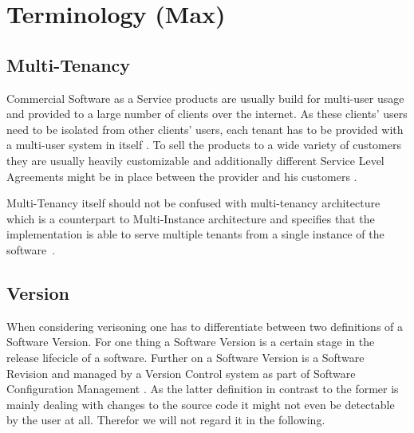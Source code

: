 \section{Terminology (Max)}
\label{sec:terminology}

\subsection{Multi-Tenancy}

Commercial Software as a Service products are usually build for multi-user usage and provided to a large number of clients over the internet. As these clients' users need to be isolated from other clients' users, each tenant has to be provided with a multi-user system in itself \cite{Chong2006a}. To sell the products to a wide variety of customers they are usually heavily customizable and additionally different Service Level Agreements might be in place between the provider and his customers \cite{Bezemer2010}.

Multi-Tenancy itself should not be confused with multi-tenancy architecture which is a counterpart to Multi-Instance architecture and specifies that the implementation is able to serve multiple tenants from a single instance of the software~\cite{Shao2011}.

\subsection{Version}

When considering verisoning one has to differentiate between two definitions of a Software Version.
For one thing a Software Version is a certain stage in the release lifecicle of a software.
Further on a Software Version is a Software Revision and managed by a Version Control system as part of Software Configuration Management \cite{swebook}.
As the latter definition in contrast to the former is mainly dealing with changes to the source code it might not even be detectable by the user at all.
Therefor we will not regard it in the following.


